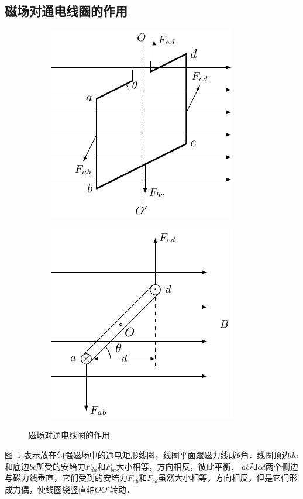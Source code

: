 \subsection{磁场对通电线圈的作用}

\begin{figure}[htbp]
    \centering
    \begin{subfigure}{0.4\linewidth}
        \centering
        \includegraphics{fig/C/1-30a.pdf}
        \caption{}\label{fig_C_1-30a}
    \end{subfigure}
    \hfil
    \begin{subfigure}{0.4\linewidth}
        \centering
        \includegraphics{fig/C/1-30b.pdf}
        \caption{}\label{fig_C_1-30b}
    \end{subfigure}
    \caption{磁场对通电线圈的作用}\label{fig_C_1-30}
\end{figure}


图~\ref{fig_C_1-30a} 表示放在匀强磁场中的通电矩形线圈，线圈平面跟磁力线成$\theta$角．线圈顶边$da$和底边$bc$所受的安培力$F_{da}$和$F_{bc}$大小相等，方向相反，彼此平衡．
$ab$和$cd$两个侧边与磁力线垂直，它们受到的安培力$F_{ab}$和$F_{cd}$虽然大小相等，方向相反，但是它们形成力偶，使线圈绕竖直轴$OO'$转动．

